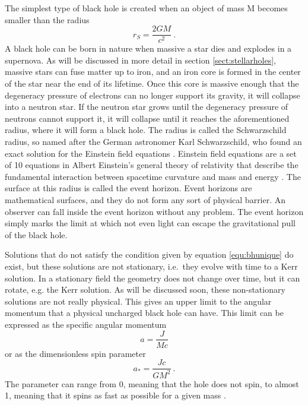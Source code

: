 \documentclass[english, oneside]{HYgradu}
\begin{document}
The simplest type of black hole is created when an object of mass M becomes smaller than the radius
\begin{equation}
r_S = \frac{2GM}{c^2} \ .
\end{equation}
A black hole can be born in nature when massive a star dies and explodes in a supernova. As will be discussed in more detail in section \ref{sect:stellarholes}, massive stars can fuse matter up to iron, and an iron core is formed in the center of the star near the end of its lifetime. Once this core is massive enough that the degeneracy pressure of electrons can no longer support its gravity, it will collapse into a neutron star. If the neutron star grows until the degeneracy pressure of neutrons cannot support it, it will collapse until it reaches the aforementioned radius, where it will form a black hole. The radius is called the Schwarzschild radius, so named after the German astronomer Karl Schwarzschild, who found an exact solution for the Einstein field equations \citep{schwarzschild:1916}. Einstein field equations are a set of 10 equations in Albert Einstein's general theory of relativity that describe the fundamental interaction between spacetime curvature and mass and energy \citep{einstein:1915}. The surface at this radius is called the event horizon. Event horizons are mathematical surfaces, and they do not form any sort of physical barrier. An observer can fall inside the event horizon without any problem. The event horizon simply marks the limit at which not even light can escape the gravitational pull of the black hole.

Solutions that do not satisfy the condition given by equation \eqref{equ:bhunique} do exist, but these solutions are not stationary, i.e.\ they evolve with time to a Kerr solution. In a stationary field the geometry does not change over time, but it can rotate, e.g. the Kerr solution. As will be discussed soon, these non-stationary solutions are not really physical. This gives an upper limit to the angular momentum that a physical uncharged black hole can have. This limit can be expressed as the specific angular momentum 
\begin{equation} \label{equ:angularmomentum}
a = \frac{J}{Mc}
\end{equation}
or as the dimensionless spin parameter
\begin{equation}
a_* = \frac{Jc}{GM^2} \ .
\end{equation}
The parameter can range from 0, meaning that the hole does not spin, to almost 1, meaning that it spins as fast as possible for a given mass \citep{middleton:2016}.
\end{document}
